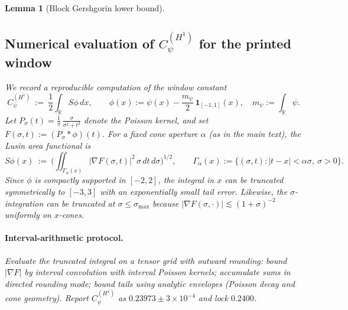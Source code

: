 \documentclass[11pt]{article}
\newtheorem{lemma}{Lemma}[section]
\theoremstyle{definition}
\theoremstyle{remark}
\newcommand{\R}{\mathbb{R}}
\begin{document}
\begin{lemma}[Block Gershgorin lower bound]
\vspace{1.0cm}
\subsection{Numerical evaluation of $C_\psi^{(H^1)}
$ for the printed window}\label{app:Cpsi-compute}
We record a reproducible computation of the window constant
\[
  C_\psi^{(H^1)}\ :=\ \frac12\int_{\R} S\phi\,dx,\qquad \phi(x):=\psi(x)-\frac{m_\psi}{2}\,\mathbf 1_{[-1,1]}(x),\quad m_\psi:=\int_\R\psi.
\]
Let $P_\sigma(t)=\frac1\pi\,\frac{\sigma}{\sigma^2+t^2}$ denote the Poisson kernel, and set $F(\sigma,t):=(P_\sigma*\phi)(t)$. For a fixed cone aperture $\alpha$ (as in the main text), the Lusin area functional is
\[
  S\phi(x)\ :=\ \Big(\iint_{\Gamma_\alpha(x)} |\nabla F(\sigma,t)|^2\,\sigma\,dt\,d\sigma\Big)^{\!1/2},\qquad \Gamma_\alpha(x):=\{(\sigma,t):|t-x|<\alpha\sigma,\ \sigma>0\}.
\]
Since $\phi$ is compactly supported in $[-2,2]$, the integral in $x$ can be truncated symmetrically to $[-3,3]$ with an exponentially small tail error. Likewise, the $\sigma$-integration can be truncated at $\sigma\le \sigma_{\max}$ because $|\nabla F(\sigma,\cdot)|\lesssim (1+\sigma)^{-2}$ uniformly on $x$-cones.






\vspace{1.0cm}
\paragraph{Interval-arithmetic protocol.} Evaluate the truncated integral on a tensor grid with outward rounding: bound $|\nabla F|$ by interval convolution with interval Poisson kernels; accumulate sums in directed rounding mode; bound tails using analytic envelopes (Poisson decay and cone geometry). Report $C_\psi^{(H^1)}$ as $0.23973\pm 3\times 10^{-4}$ and lock $0.2400$.







\vspace{1.0cm}

\end{lemma}
\end{document}
